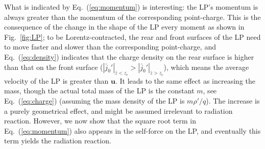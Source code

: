 \documentclass[a4paper,fleqn]{cas-sc}
\begin{document}

What is indicated by Eq.~(\ref{eq:momentum}) is interesting: the LP's momentum is always greater than the momentum of the corresponding point-charge. This is the consequence of the change in the shape of the LP every moment as shown in Fig.~\ref{fig:LP}; to be Lorentz-contracted, the rear and front surfaces of the LP need to move faster and slower than the corresponding point-charge, and Eq.~(\ref{eq:density}) indicates that the charge density on the rear surface is higher than that on the front surface ($\left|\bar{j}_{0}'\right|_{\bar{z}<z_{c}} > \left|\bar{j}_{0}'\right|_{\bar{z}>z_{c}}$), which means the average velocity of the LP is greater than $\mathbf{u}$. It leads to the same effect as increasing the mass, though the actual total mass of the LP is the constant $m$, see Eq.~(\ref{eq:charge}) (assuming the mass density of the LP is $m\rho'/q$). The increase is a purely geometrical effect, and might be assumed irrelevant to radiation reaction. However, we now show that the square root term in Eq.~(\ref{eq:momentum}) also appears in the self-force on the LP, and eventually this term yields the radiation reaction.
\end{document}
